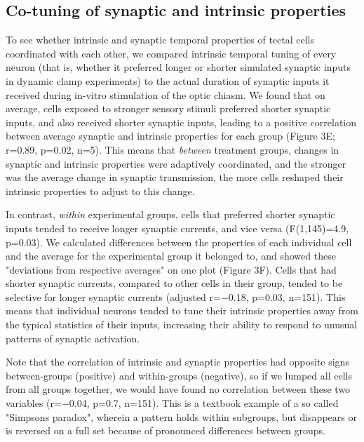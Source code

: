 \documentclass{article}
\begin{document}
\subsection*{Co-tuning of synaptic and intrinsic properties}

To see whether intrinsic and synaptic temporal properties of tectal cells coordinated with each other, we compared intrinsic temporal tuning of every neuron (that is, whether it preferred longer or shorter simulated synaptic inputs in dynamic clamp experiments) to the actual duration of synaptic inputs it received during in-vitro stimulation of the optic chiasm. We found that on average, cells exposed to stronger sensory stimuli preferred shorter synaptic inputs, and also received shorter synaptic inputs, leading to a positive correlation between average synaptic and intrinsic properties for each group (Figure 3E; r=0.89, p=0.02, n=5). This means that \textit{between} treatment groups, changes in synaptic and intrinsic properties were adaptively coordinated, and the stronger was the average change in synaptic transmission, the more cells reshaped their intrinsic properties to adjust to this change.

In contrast, \textit{within} experimental groups, cells that preferred shorter synaptic inputs tended to receive longer synaptic currents, and vice versa (F(1,145)=4.9, p=0.03). We calculated differences between the properties of each individual cell and the average for the experimental group it belonged to, and showed these "deviations from respective averages" on one plot (Figure 3F). Cells that had shorter synaptic currents, compared to other cells in their group, tended to be selective for longer synaptic currents (adjusted r=$-$0.18, p=0.03, n=151). This means that individual neurons tended to tune their intrinsic properties away from the typical statistics of their inputs, increasing their ability to respond to unusual patterns of synaptic activation. 


Note that the correlation of intrinsic and synaptic properties had opposite signs between-groups (positive) and within-groups (negative), so if we lumped all cells from all groups together, we would have found no correlation between these two variables (r=$-$0.04, p=0.7, n=151). This is a textbook example of a so called "Simpsons paradox", wherein a pattern holds within subgroups, but disappears or is reversed on a full set because of pronounced differences between groups.
\end{document}

